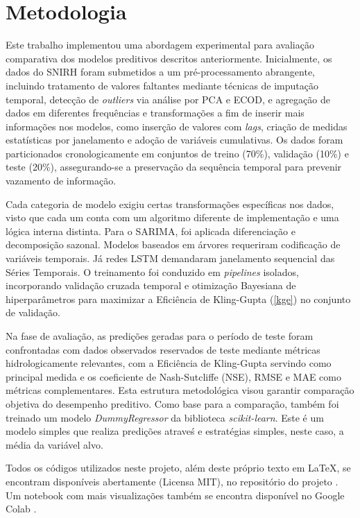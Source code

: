 \section{Metodologia}
Este trabalho implementou uma abordagem experimental para avaliação comparativa dos modelos preditivos descritos
anteriormente. Inicialmente, os dados do SNIRH foram submetidos a um pré-processamento abrangente, incluindo tratamento
de valores faltantes mediante técnicas de imputação temporal, detecção de \textit{outliers} via análise por PCA e ECOD,
e agregação de dados em diferentes frequências e transformações a fim de inserir mais informações nos modelos, como
inserção de valores com \textit{lags}, criação de medidas estatísticas por janelamento e adoção de variáveis
cumulativas. Os dados foram particionados cronologicamente em conjuntos de treino (70\%), validação (10\%) e teste
(20\%), assegurando-se a preservação da sequência temporal para prevenir vazamento de informação.

Cada categoria de modelo exigiu certas transformações específicas nos dados, visto que cada um conta com um algoritmo
diferente de implementação e uma lógica interna distinta. Para o SARIMA, foi aplicada diferenciação e decomposição
sazonal. Modelos baseados em árvores requeriram codificação de variáveis temporais. Já redes LSTM demandaram janelamento
sequencial das Séries Temporais. O treinamento foi conduzido em \textit{pipelines} isolados, incorporando validação
cruzada temporal e otimização Bayesiana de hiperparâmetros para maximizar a Eficiência de Kling-Gupta (\autoref{kge}) no
conjunto de validação.

Na fase de avaliação, as predições geradas para o período de teste foram confrontadas com dados observados reservados de
teste mediante métricas hidrologicamente relevantes, com a Eficiência de Kling-Gupta servindo como principal medida e os
coeficiente de Nash-Sutcliffe (NSE), RMSE e MAE como métricas complementares. Esta estrutura metodológica visou garantir
comparação objetiva do desempenho preditivo. Como base para a comparação, também foi treinado um modelo
\textit{DummyRegressor} da biblioteca \textit{scikit-learn}. Este é um modelo simples que realiza predições atraveś e
estratégias simples, neste caso, a média da variável alvo. 

Todos os códigos utilizados neste projeto, além deste próprio texto em \LaTeX, se encontram disponíveis abertamente
(Licensa MIT), no repositório do projeto \cite{machado}. Um notebook com mais visualizações também se encontra
disponível no Google Colab \cite{colab}.

